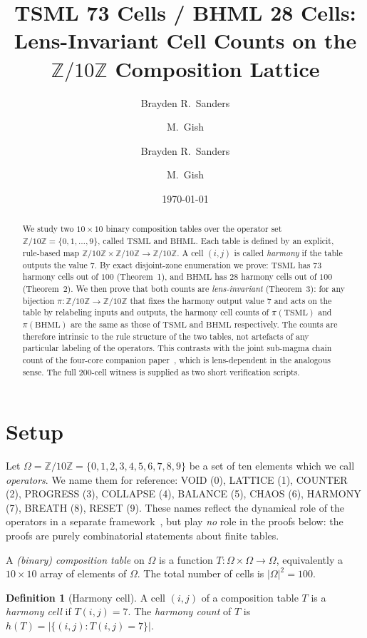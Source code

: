 \documentclass[11pt,reqno]{amsart}
\title[TSML 73 / BHML 28 cells on $\Zten$]
  {TSML 73 Cells / BHML 28 Cells:\\
   Lens-Invariant Cell Counts on the\\
   $\mathbb{Z}/10\mathbb{Z}$ Composition Lattice}
\author{Brayden R.\ Sanders \and M.\ Gish}
\author{Brayden R.\ Sanders \and M.\ Gish}
\date{\today}
\theoremstyle{plain}
\theoremstyle{definition}
\newtheorem{definition}[theorem]{Definition}
\theoremstyle{remark}
\newcommand{\Z}{\mathbb{Z}}
\newcommand{\Zten}{\Z/10\Z}
\newcommand{\TSML}{\mathrm{TSML}}
\newcommand{\BHML}{\mathrm{BHML}}
\begin{document}
\begin{abstract}
We study two $10\times10$ binary composition tables over the
operator set $\Zten = \{0,1,\ldots,9\}$, called $\TSML$ and
$\BHML$. Each table is defined by an explicit, rule-based map
$\Zten \times \Zten \to \Zten$. A cell $(i,j)$ is called
\emph{harmony} if the table outputs the value $7$. By exact
disjoint-zone enumeration we prove:
$\TSML$ has $73$ harmony cells out of $100$ (Theorem~1), and
$\BHML$ has $28$ harmony cells out of $100$ (Theorem~2). We then
prove that both counts are \emph{lens-invariant} (Theorem~3): for
any bijection $\pi : \Zten \to \Zten$ that fixes the harmony
output value $7$ and acts on the table by relabeling inputs and
outputs, the harmony cell counts of $\pi(\TSML)$ and $\pi(\BHML)$
are the same as those of $\TSML$ and $\BHML$ respectively. The
counts are therefore intrinsic to the rule structure of the two
tables, not artefacts of any particular labeling of the
operators. This contrasts with the joint sub-magma chain count of
the four-core companion paper~\cite{J02}, which is lens-dependent
in the analogous sense. The full $200$-cell witness is supplied as
two short verification scripts.
\end{abstract}

\maketitle

\section{Setup}\label{sec:setup}

Let $\Omega = \Zten = \{0, 1, 2, 3, 4, 5, 6, 7, 8, 9\}$ be a set of
ten elements which we call \emph{operators}. We name them for
reference: VOID (0), LATTICE (1), COUNTER (2), PROGRESS (3),
COLLAPSE (4), BALANCE (5), CHAOS (6), HARMONY (7), BREATH (8),
RESET (9). These names reflect the dynamical role of the operators
in a separate framework~\cite{Sanders2026}, but play \emph{no} role
in the proofs below: the proofs are purely combinatorial statements
about finite tables.

A \emph{(binary) composition table} on $\Omega$ is a function
$T : \Omega \times \Omega \to \Omega$, equivalently a $10 \times 10$
array of elements of $\Omega$. The total number of cells is
$|\Omega|^2 = 100$.

\begin{definition}[Harmony cell]\label{def:harm}
A cell $(i, j)$ of a composition table $T$ is a \emph{harmony cell}
if $T(i, j) = 7$. The \emph{harmony count} of $T$ is
$h(T) = |\{(i, j) : T(i, j) = 7\}|$.
\end{definition}
\end{document}
